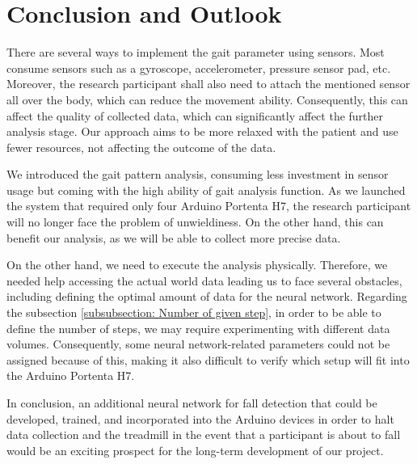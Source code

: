 \chapter{Conclusion and Outlook}

There are several ways to implement the gait parameter using sensors. Most consume sensors such as a gyroscope, accelerometer, pressure sensor pad, etc. Moreover, the research participant shall also need to attach the mentioned sensor all over the body, which can reduce the movement ability. Consequently, this can affect the quality of collected data, which can significantly affect the further analysis stage. Our approach aims to be more relaxed with the patient and use fewer resources, not affecting the outcome of the data.

\bigskip

We introduced the gait pattern analysis, consuming less investment in sensor usage but coming with the high ability of gait analysis function. As we launched the system that required only four Arduino Portenta H7, the research participant will no longer face the problem of unwieldiness. On the other hand, this can benefit our analysis, as we will be able to collect more precise data.

\bigskip

On the other hand, we need to execute the analysis physically. Therefore, we needed help accessing the actual world data leading us to face several obstacles, including defining the optimal amount of data for the neural network. Regarding the subsection \ref{subsubsection: Number of given step}, in order to be able to define the number of steps, we may require experimenting with different data volumes. Consequently, some neural network-related parameters could not be assigned because of this, making it also difficult to verify which setup will fit into the Arduino Portenta H7.

\bigskip

In conclusion, an additional neural network for fall detection that could be developed, trained, and incorporated into the Arduino devices in order to halt data collection and the treadmill in the event that a participant is about to fall would be an exciting prospect for the long-term development of our project.